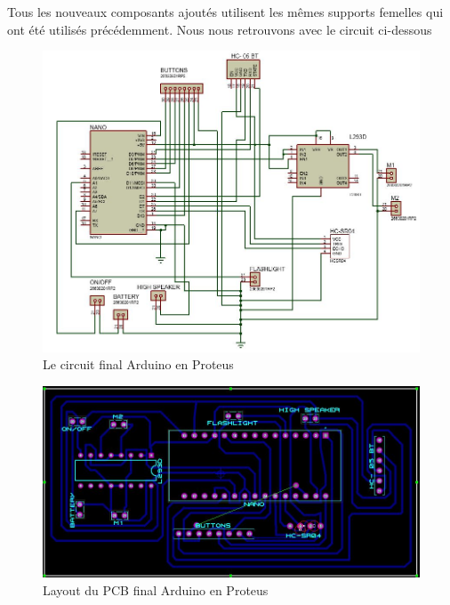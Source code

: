 \FloatBarrier

Tous les nouveaux composants ajoutés utilisent les mêmes supports femelles qui ont été utilisés précédemment. Nous nous retrouvons avec le circuit ci-dessous

\begin{figure}[!htbp]
    \centering
    \includegraphics[width=\textwidth]{assets/conception1/img62.jpg}
    \caption{Le circuit final Arduino en Proteus}
\end{figure}

\begin{figure}[!htbp]
    \centering
    \includegraphics[width=\textwidth]{assets/conception1/img66.jpg}
    \caption{Layout du PCB final Arduino en Proteus}
\end{figure}

